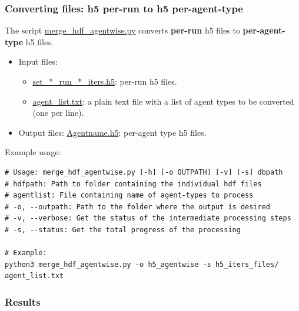 \documentclass[10pt,a4paper]{article}
\begin{document}
\subsubsection{Converting files: h5 per-run to h5 per-agent-type}
The script \url{merge_hdf_agentwise.py} converts \textbf{per-run} h5 files to \textbf{per-agent-type} h5 files.
\begin{itemize}
\item Input files: 
	\begin{itemize}
	\item \url{set_*_run_*_iters.h5}: per-run h5 files.
	\item \url{agent_list.txt}: a plain text file with a list of agent types to be converted (one per line).
	\end{itemize}
\item Output files: \url{Agentname.h5}: per-agent type h5 files.
\end{itemize}

Example usage:
\begin{verbatim}
# Usage: merge_hdf_agentwise.py [-h] [-o OUTPATH] [-v] [-s] dbpath
# hdfpath: Path to folder containing the individual hdf files
# agentlist: File containing name of agent-types to process
# -o, --outpath: Path to the folder where the output is desired
# -v, --verbose: Get the status of the intermediate processing steps
# -s, --status: Get the total progress of the processing

# Example:
python3 merge_hdf_agentwise.py -o h5_agentwise -s h5_iters_files/ agent_list.txt
\end{verbatim}


\subsubsection{Results}
\end{document}
